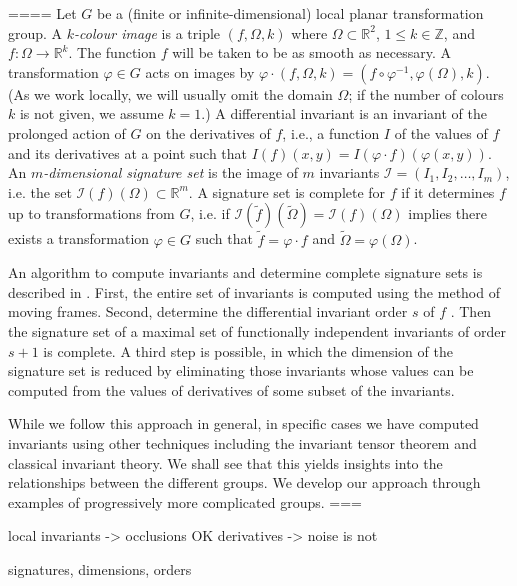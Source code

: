 \documentclass[review,onefignum,onetabnum]{siamonline190516}
\def\R{\mathbb{R}}
\begin{document}
====
Let $G$ be a (finite or infinite-dimensional) local planar transformation group. 
A {\em $k$-colour image} is a triple $(f,\Omega,k)$ where $\Omega\subset\R^2$, $1\le k\in\mathbb{Z}$,
and $f\colon\Omega\to\R^k$. The function $f$ will be taken to be as smooth as necessary.
A transformation $\varphi\in G$ acts on images by $\varphi\cdot (f,\Omega,k) = (f\circ\varphi^{-1},\varphi(\Omega),k)$.
(As we work locally, we will usually omit the domain $\Omega$; if the number of colours $k$ is not given, we assume $k=1$.)  A differential invariant is an invariant of the prolonged action of $G$ on the derivatives of $f$, i.e., a function $I$ of the values of $f$ and its derivatives at a point such that $I(f)(x,y) = I(\varphi\cdot f)(\varphi(x,y))$. An {\em $m$-dimensional signature set} is the image of $m$ invariants $\mathcal{I}=(I_1,I_2,\dots,I_m)$, i.e. the
set $\mathcal{I}(f)(\Omega)\subset \mathbb{R}^m$. 
A signature set is complete for $f$ if it determines $f$ up to transformations from $G$, i.e. if $\mathcal{I}(\tilde f)(\tilde\Omega) = \mathcal{I}(f)(\Omega)$ implies there exists a transformation $\varphi\in G$ such that $\tilde f = \varphi\cdot f$ and $\tilde \Omega = \varphi(\Omega)$.

An algorithm to compute invariants and determine complete signature sets is
described in \cite{olver2001}. First, the entire set of invariants is
computed using the method of moving frames. Second, determine the
differential invariant order $s$ of $f$ . Then the signature set of a maximal
set of functionally independent invariants of order $s+1$ is complete. A
third step is possible, in which the dimension of the signature set is
reduced by eliminating those invariants whose values can be computed from the
values of derivatives of some subset of the invariants.

While we follow this approach in general, in specific cases we have computed invariants using other techniques
including the invariant tensor theorem and classical invariant theory. We shall see that this yields insights into the relationships between the different groups. We develop our approach through examples of progressively more complicated groups.
===

local invariants -> occlusions OK
derivatives -> noise is not

signatures, dimensions, orders
\end{document}
